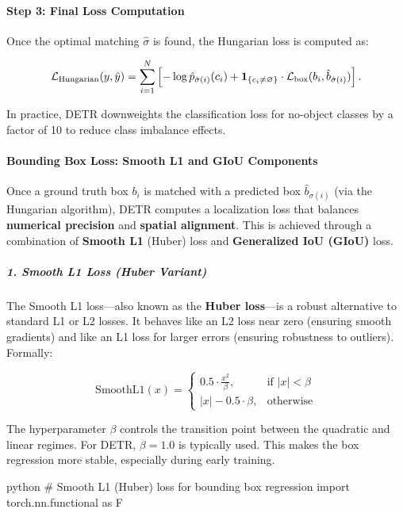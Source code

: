 \begin{enrichment}
\begin{enrichment}
		 \paragraph{Step 3: Final Loss Computation}
		 
		 Once the optimal matching \( \hat{\sigma} \) is found, the Hungarian loss is computed as:
		 
		 \[
		 \mathcal{L}_\text{Hungarian}(y, \hat{y}) = \sum_{i=1}^N \left[
		 - \log \hat{p}_{\hat{\sigma}(i)}(c_i)
		 + \mathbf{1}_{\{c_i \neq \varnothing\}} \cdot \mathcal{L}_\text{box}(b_i, \hat{b}_{\hat{\sigma}(i)})
		 \right].
		 \]
		 
		 In practice, DETR downweights the classification loss for no-object classes by a factor of 10 to reduce class imbalance effects.
		 
		 \paragraph{Bounding Box Loss: Smooth L1 and GIoU Components}
		 \label{par:detr_bounding_box_loss_components}
		 
		 Once a ground truth box \( b_i \) is matched with a predicted box \( \hat{b}_{\sigma(i)} \) (via the Hungarian algorithm), DETR computes a localization loss that balances \textbf{numerical precision} and \textbf{spatial alignment}. This is achieved through a combination of \textbf{Smooth L1} (Huber) loss and \textbf{Generalized IoU (GIoU)} loss.
		 
		 \subparagraph{1. Smooth L1 Loss (Huber Variant)}
		 
		 The Smooth L1 loss—also known as the \textbf{Huber loss}—is a robust alternative to standard L1 or L2 losses. It behaves like an L2 loss near zero (ensuring smooth gradients) and like an L1 loss for larger errors (ensuring robustness to outliers). Formally:
		 
		 \[
		 \text{SmoothL1}(x) = 
		 \begin{cases}
		 	0.5 \cdot \frac{x^2}{\beta}, & \text{if } |x| < \beta \\
		 	|x| - 0.5 \cdot \beta, & \text{otherwise}
		 \end{cases}
		 \]
		 
		 \noindent
		 The hyperparameter \( \beta \) controls the transition point between the quadratic and linear regimes. For DETR, \( \beta = 1.0 \) is typically used. This makes the box regression more stable, especially during early training.
		 
		 \begin{mintedbox}[bgcolor=black!3, fontsize=\small, linenos]{python}
		 	# Smooth L1 (Huber) loss for bounding box regression
		 	import torch.nn.functional as F
		 	

\end{mintedbox}
\end{enrichment}
\end{enrichment}
